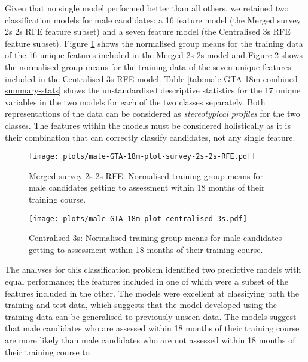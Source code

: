 \documentclass[
  12pt,
  a4paper,
]{book}
\begin{document}
Given that no single model performed better than all others, we retained two classification models for male candidates: a 16 feature model (the Merged survey 2s 2s RFE feature subset) and a seven feature model (the Centralised 3s RFE feature subset). Figure \ref{fig:male-GTA-18m-plot-survey-2s-2s-RFE} shows the normalised group means for the training data of the 16 unique features included in the Merged 2s 2s model and Figure \ref{fig:male-GTA-18m-plot-centralised-3s} shows the normalised group means for the training data of the seven unique features included in the Centralised 3s RFE model. Table \ref{tab:male-GTA-18m-combined-summary-stats} shows the unstandardised descriptive statistics for the 17 unique variables in the two models for each of the two classes separately. Both representations of the data can be considered as \emph{stereotypical profiles} for the two classes. The features within the models must be considered holistically as it is their combination that can correctly classify candidates, not any single feature.

\begin{figure}
\centering
\texttt{[image: plots/male-GTA-18m-plot-survey-2s-2s-RFE.pdf]}
\caption{\label{fig:male-GTA-18m-plot-survey-2s-2s-RFE}Merged survey 2s 2s RFE: Normalised training group means for male candidates getting to assessment within 18 months of their training course.}
\end{figure}

\begin{figure}
\centering
\texttt{[image: plots/male-GTA-18m-plot-centralised-3s.pdf]}
\caption{\label{fig:male-GTA-18m-plot-centralised-3s}Centralised 3s: Normalised training group means for male candidates getting to assessment within 18 months of their training course.}
\end{figure}

The analyses for this classification problem identified two predictive models with equal performance; the features included in one of which were a subset of the features included in the other. The models were excellent at classifying both the training and test data, which suggests that the model developed using the training data can be generalised to previously unseen data. The models suggest that male candidates who are assessed within 18 months of their training course are more likely than male candidates who are not assessed within 18 months of their training course to
\end{document}
